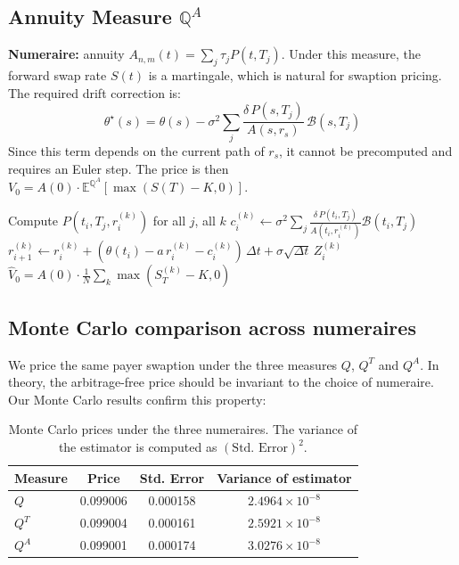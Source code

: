 \documentclass[12pt, a4paper]{article}
\newcommand{\E}{\mathbb{E}}
\newcommand{\Q}{\mathbb{Q}}
\begin{document}
\subsection{Annuity Measure $\Q^A$}

\textbf{Numeraire:} annuity $A_{n,m}(t) = \sum_j \tau_j P(t,T_j)$. Under this measure, the forward swap rate $S(t)$ is a martingale, which is natural for swaption pricing. The required drift correction is:
\begin{equation}
\theta^\star(s) = \theta(s) - \sigma^2 \sum_{j} \frac{\delta\, P(s,T_j)}{A(s,r_s)}\,\mathcal{B}(s,T_j)
\end{equation}
Since this term depends on the current path of $r_s$, it cannot be precomputed and requires an Euler step. The price is then $V_0 = A(0)\cdot\E^{\Q^A}[\max(S(T)-K,0)]$.

\begin{algorithm}[H]
\caption{Monte Carlo under $\Q^A$ (hybrid Euler scheme)}
\begin{algorithmic}[1]
    \State Compute $P(t_i, T_j, r_i^{(k)})$ for all $j$, all $k$
    \State $c_i^{(k)} \leftarrow \sigma^2 \sum_j \frac{\delta\, P(t_i,T_j)}{A(t_i,r_i^{(k)})} \mathcal{B}(t_i,T_j)$
    \State $r_{i+1}^{(k)} \leftarrow r_i^{(k)} + (\theta(t_i) - a\,r_i^{(k)} - c_i^{(k)})\,\Delta t + \sigma\sqrt{\Delta t}\, Z_i^{(k)}$
\EndFor
\State $\hat{V}_0 = A(0)\cdot\frac{1}{N}\sum_k \max(S_T^{(k)} - K, 0)$
\end{algorithmic}
\end{algorithm}

\subsection{Monte Carlo comparison across numeraires}

We price the same payer swaption under the three measures $Q$, $Q^T$ and $Q^A$.
In theory, the arbitrage-free price should be invariant to the choice of numeraire.
Our Monte Carlo results confirm this property:

\begin{table}[H]
\centering
\begin{tabular}{lccc}
\toprule
Measure & Price & Std. Error & Variance of estimator \\
\midrule
$Q$   & 0.099006 & 0.000158 & $2.4964\times 10^{-8}$ \\
$Q^T$ & 0.099004 & 0.000161 & $2.5921\times 10^{-8}$ \\
$Q^A$ & 0.099001 & 0.000174 & $3.0276\times 10^{-8}$ \\
\bottomrule
\end{tabular}
\caption{Monte Carlo prices under the three numeraires. The variance of the estimator is computed as $(\text{Std. Error})^2$.}
\end{table}
\end{document}

